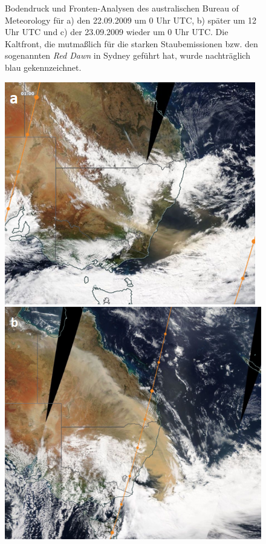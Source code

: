 \documentclass[12pt,a4paper,onecolumn,draft]{scrartcl}
\begin{document}
\begin{figure}[ht]
\begin{minipage}[c]{0.33\textwidth}
	\end{minipage}\hfill
	\caption{Bodendruck und Fronten-Analysen des australischen Bureau of Meteorology für a) den 22.09.2009 um 0 Uhr UTC, b) später um 12 Uhr UTC und c) der 23.09.2009 wieder um 0 Uhr UTC. Die Kaltfront, die mutmaßlich für die starken Staubemissionen bzw. den sogenannten \textit{Red Dawn} in Sydney geführt hat, wurde nachträglich blau gekennzeichnet.} \label{fig:bom_analysis}
\end{figure}

\begin{figure}[ht]
	\begin{minipage}[c]{0.33\textwidth}
		\includegraphics[width=\textwidth]{bilder/reddawn/2209T01.png}
	\end{minipage}\hfill
		\begin{minipage}[c]{0.329\textwidth}
		\includegraphics[width=\textwidth]{bilder/reddawn/2309T00.png}

\end{minipage}
\end{figure}
\end{document}
